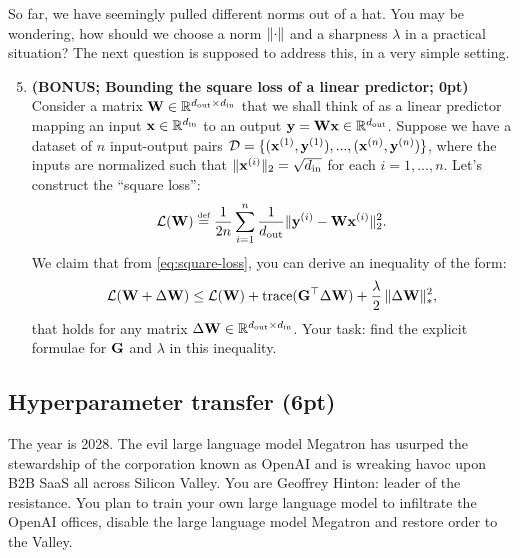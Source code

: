\documentclass[12pt,letterpaper]{article}
\begin{document}
So far, we have seemingly pulled different norms out of a hat. You may be wondering, how should we choose a norm $\Vert {\cdot} \Vert$ and a sharpness $\lambda$ in a practical situation? The next question is supposed to address this, in a very simple setting.

\begin{enumerate}
\setcounter{enumi}{4}

    \item \textbf{(BONUS; Bounding the square loss of a linear predictor; 0pt)} Consider a matrix ${\mathbf{W}} \in \mathbb{R}^{d_\mathrm{out}\times d _\mathrm{in}}$ that we shall think of as a linear predictor mapping an input ${\mathbf{x}} \in \mathbb{R}^{d_\mathrm{in}}$ to an output ${\mathbf{y}} = {\mathbf{W}} {\mathbf{x}} \in \mathbb{R}^{d_\mathrm{out}}$. Suppose we have a dataset of $n$ input-output pairs $\mathcal{D} = \{({\mathbf{x}}^{(1)},{\mathbf{y}}^{(1)}), ..., ({\mathbf{x}}^{(n)},{\mathbf{y}}^{(n)})\}$, where the inputs are normalized such that $\|{\mathbf{x}}^{(i)}\|_2 = \sqrt{d_{\mathrm{in}}}$ for each $i=1,...,n$. Let's construct the ``square loss'':
\begin{equation}\label{eq:square-loss}
    \mathcal{L}({\mathbf{W}}) \overset{\mbox{\normalfont\tiny def}}{=} \frac{1}{2n}\sum_{i=1}^n \frac{1}{d_{\mathrm{out}}}\Vert {{\mathbf{y}}^{(i)} - {\mathbf{W}}{\mathbf{x}}^{(i)}} \Vert_2^2.
\end{equation}
We claim that from \cref{eq:square-loss}, you can derive an inequality of the form:
\begin{equation}\label{eq:square-majorization}
    \mathcal{L}({\mathbf{W}} + \Delta {\mathbf{W}}) \leq \mathcal{L}({\mathbf{W}}) + \operatorname{trace}({\mathbf{G}}^\top \Delta {\mathbf{W}}) + \frac{\lambda}{2} \,\Vert {\Delta {\mathbf{W}}} \Vert_*^2,
\end{equation}
that holds for any matrix $\Delta{\mathbf{W}} \in \mathbb{R}^{d_\mathrm{out}\times d _\mathrm{in}}$. Your task: find the explicit formulae for ${\mathbf{G}}$ and $\lambda$ in this inequality.

    
    
\end{enumerate}


\clearpage

\subsection*{Hyperparameter transfer (6pt)}
The year is 2028. The evil large language model Megatron has usurped the stewardship of the corporation known as OpenAI and is wreaking havoc upon B2B SaaS all across Silicon Valley. You are Geoffrey Hinton: leader of the resistance. You plan to train your own large language model to infiltrate the OpenAI offices, disable the large language model Megatron and restore order to the Valley. 
\end{document}
